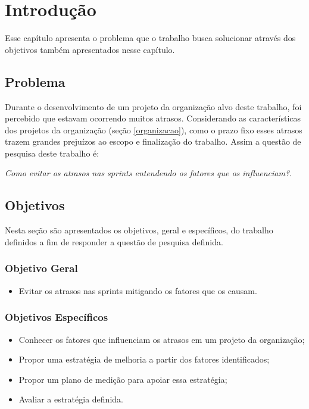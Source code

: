 \chapter[Introdução]{Introdução}

Esse capítulo apresenta o problema que o trabalho busca solucionar através dos objetivos também apresentados nesse capítulo.

\section{Problema}

Durante o desenvolvimento de um projeto da organização alvo deste trabalho, foi percebido que estavam ocorrendo muitos
atrasos. Considerando as características dos projetos da organização (seção \ref{organizacao}), como o prazo fixo
esses atrasos trazem grandes prejuízos ao escopo e finalização do trabalho. Assim a questão de pesquisa deste trabalho é:

\begin{centering}
 \textit{Como evitar os atrasos nas sprints entendendo os fatores que os influenciam?}.
\end{centering}

\vfill
\pagebreak
  
\section{Objetivos}

	Nesta seção são apresentados os objetivos, geral e específicos, do trabalho definidos a fim de responder a questão de pesquisa definida.

\subsection{Objetivo Geral}

\begin{itemize}
  \item Evitar os atrasos nas sprints mitigando os fatores que os causam.
\end{itemize}

\subsection{Objetivos Específicos}

\begin{itemize}
  \item Conhecer os fatores que influenciam os atrasos em um projeto da organização;
  \item Propor uma estratégia de melhoria a partir dos fatores identificados;
  \item Propor um plano de medição para apoiar essa estratégia;
  \item Avaliar a estratégia definida.
\end{itemize}

\vfill
\pagebreak

